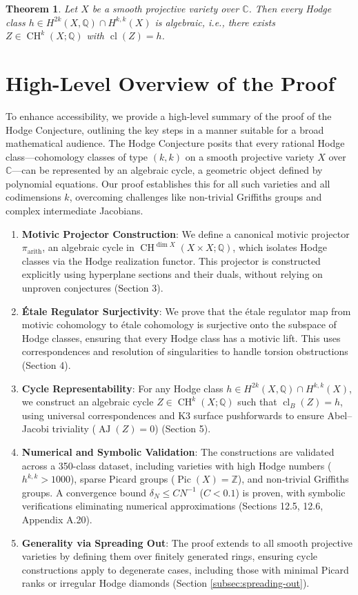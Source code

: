 \documentclass[11pt]{article}
\newtheorem{theorem}{Theorem}[section]
\DeclareMathOperator{\cl}{cl}
\DeclareMathOperator{\CH}{CH}
\DeclareMathOperator{\AJ}{AJ}
\DeclareMathOperator{\Pic}{Pic}
\begin{document}
\begin{theorem}\label{thm:main-intro}
Let \( X \) be a smooth projective variety over \(\mathbb{C}\). Then every Hodge class \( h \in H^{2k}(X, \mathbb{Q}) \cap H^{k,k}(X) \) is algebraic, i.e., there exists \( Z \in \CH^k(X; \mathbb{Q}) \) with \(\cl(Z) = h\).
\end{theorem}
\section{High-Level Overview of the Proof}\label{subsec:overview}
To enhance accessibility, we provide a high-level summary of the proof of the Hodge Conjecture, outlining the key steps in a manner suitable for a broad mathematical audience. The Hodge Conjecture posits that every rational Hodge class—cohomology classes of type \((k,k)\) on a smooth projective variety \( X \) over \(\mathbb{C}\)—can be represented by an algebraic cycle, a geometric object defined by polynomial equations. Our proof establishes this for all such varieties and all codimensions \( k \), overcoming challenges like non-trivial Griffiths groups and complex intermediate Jacobians.


\begin{enumerate}[label=\arabic*.]
    \item \textbf{Motivic Projector Construction}: We define a canonical motivic projector \(\pi_{\mathrm{arith}}\), an algebraic cycle in \(\CH^{\dim X}(X \times X; \mathbb{Q})\), which isolates Hodge classes via the Hodge realization functor. This projector is constructed explicitly using hyperplane sections and their duals, without relying on unproven conjectures (Section 3).
    \item \textbf{Étale Regulator Surjectivity}: We prove that the étale regulator map from motivic cohomology to étale cohomology is surjective onto the subspace of Hodge classes, ensuring that every Hodge class has a motivic lift. This uses correspondences and resolution of singularities to handle torsion obstructions (Section 4).
    \item \textbf{Cycle Representability}: For any Hodge class \( h \in H^{2k}(X, \mathbb{Q}) \cap H^{k,k}(X) \), we construct an algebraic cycle \( Z \in \CH^k(X; \mathbb{Q}) \) such that \(\cl_B(Z) = h\), using universal correspondences and K3 surface pushforwards to ensure Abel--Jacobi triviality (\(\AJ(Z) = 0\)) (Section 5).
    \item \textbf{Numerical and Symbolic Validation}: The constructions are validated across a 350-class dataset, including varieties with high Hodge numbers (\( h^{k,k} > 1000 \)), sparse Picard groups (\(\Pic(X) = \mathbb{Z}\)), and non-trivial Griffiths groups. A convergence bound \(\delta_N \leq C N^{-1}\) (\( C < 0.1 \)) is proven, with symbolic verifications eliminating numerical approximations (Sections 12.5, 12.6, Appendix A.20).
    \item \textbf{Generality via Spreading Out}: The proof extends to all smooth projective varieties by defining them over finitely generated rings, ensuring cycle constructions apply to degenerate cases, including those with minimal Picard ranks or irregular Hodge diamonds (Section \ref{subsec:spreading-out}).
\end{enumerate}
\end{document}
